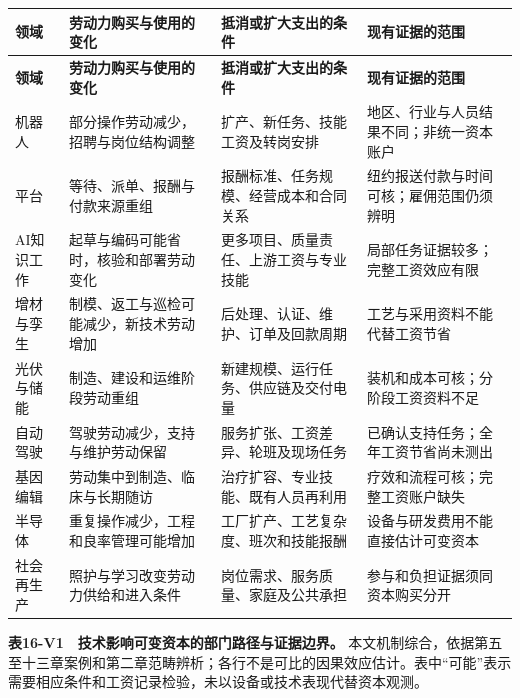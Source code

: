 \documentclass[UTF8,fontset=windows,12pt,a4paper,oneside,openany]{ctexbook}
\begin{document}
\begingroup\footnotesize\setlength{\tabcolsep}{4pt}\renewcommand{\arraystretch}{1.25}
\begin{longtable}{>{\raggedright\arraybackslash}p{}>{\raggedright\arraybackslash}p{}>{\raggedright\arraybackslash}p{}>{\raggedright\arraybackslash}p{}}
\toprule
\textbf{领域} & \textbf{劳动力购买与使用的变化} & \textbf{抵消或扩大支出的条件} & \textbf{现有证据的范围} \\
\midrule\endfirsthead
\toprule
\textbf{领域} & \textbf{劳动力购买与使用的变化} & \textbf{抵消或扩大支出的条件} & \textbf{现有证据的范围} \\
\midrule\endhead
\bottomrule\endfoot
机器人 & 部分操作劳动减少，招聘与岗位结构调整 & 扩产、新任务、技能工资及转岗安排 & 地区、行业与人员结果不同；非统一资本账户 \\
平台 & 等待、派单、报酬与付款来源重组 & 报酬标准、任务规模、经营成本和合同关系 & 纽约报送付款与时间可核；雇佣范围仍须辨明 \\
AI知识工作 & 起草与编码可能省时，核验和部署劳动变化 & 更多项目、质量责任、上游工资与专业技能 & 局部任务证据较多；完整工资效应有限 \\
增材与孪生 & 制模、返工与巡检可能减少，新技术劳动增加 & 后处理、认证、维护、订单及回款周期 & 工艺与采用资料不能代替工资节省 \\
光伏与储能 & 制造、建设和运维阶段劳动重组 & 新建规模、运行任务、供应链及交付电量 & 装机和成本可核；分阶段工资资料不足 \\
自动驾驶 & 驾驶劳动减少，支持与维护劳动保留 & 服务扩张、工资差异、轮班及现场任务 & 已确认支持任务；全年工资节省尚未测出 \\
基因编辑 & 劳动集中到制造、临床与长期随访 & 治疗扩容、专业技能、既有人员再利用 & 疗效和流程可核；完整工资账户缺失 \\
半导体 & 重复操作减少，工程和良率管理可能增加 & 工厂扩产、工艺复杂度、班次和技能报酬 & 设备与研发费用不能直接估计可变资本 \\
社会再生产 & 照护与学习改变劳动力供给和进入条件 & 岗位需求、服务质量、家庭及公共承担 & 参与和负担证据须同资本购买分开 \\
\end{longtable}\endgroup

\textbf{表16-V1　技术影响可变资本的部门路径与证据边界。} 本文机制综合，依据第五至十三章案例和第二章范畴辨析；各行不是可比的因果效应估计。表中“可能”表示需要相应条件和工资记录检验，未以设备或技术表现代替资本观测。
\end{document}
